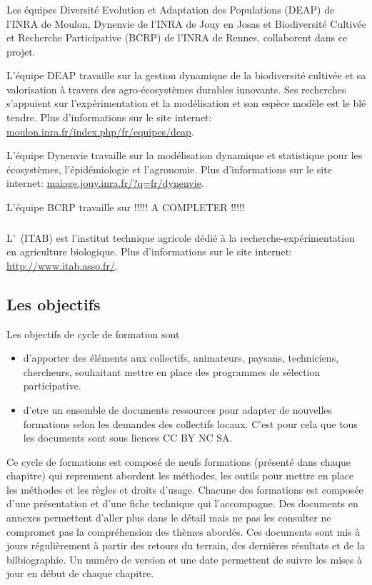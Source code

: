 \subsubsection{\INRA}
Les équipes 
Diversité Evolution et Adaptation des Populations (DEAP) de l'INRA de Moulon, 
Dynenvie de l'INRA de Jouy en Josas et 
Biodiversité Cultivée et Recherche Participative (BCRP) de l'INRA de Rennes, 
collaborent dans ce projet.

L'équipe DEAP travaille sur la gestion dynamique de la biodiversité cultivée et sa valorisation à travers des agro-écosystèmes durables innovants. 
Ses recherches s'appuient sur l'expérimentation et la modélisation et son espèce modèle est le blé tendre.
Plus d'informations sur le site internet: \url{moulon.inra.fr/index.php/fr/equipes/deap}.

L'équipe Dynenvie travaille sur la modélisation dynamique et statistique pour les écosystèmes, l'épidémiologie et l'agronomie.
Plus d'informations sur le site internet: \url{maiage.jouy.inra.fr/?q=fr/dynenvie}.

L'équipe BCRP travaille sur !!!!! A COMPLETER !!!!!

\subsubsection{\ITAB}
L'\ITAB~(ITAB) est l'institut technique agricole dédié à la recherche-expérimentation en agriculture biologique.
Plus d'informations sur le site internet: \url{http://www.itab.asso.fr/}.


\subsection{Les objectifs}
Les objectifs de cycle de formation sont

\begin{itemize}
\item d'apporter des éléments aux collectifs, animateurs, paysans, techniciens, chercheurs, souhaitant mettre en place des programmes de sélection participative.
\item d'etre un ensemble de documents ressources pour adapter de nouvelles formations selon les demandes des collectifs locaux. C'est pour cela que tous les documents sont sous liences CC BY NC SA.
\end{itemize}

Ce cycle de formations est composé de neufs formations (présenté dans chaque chapitre) qui reprennent abordent les méthodes, les outils pour mettre en place les méthodes et les règles et droits d’usage.
Chacune des formations est composée d’une présentation et d’une fiche technique qui l’accompagne. 
Des documents en annexes permettent d’aller plus dans le détail mais ne pas les consulter ne
compromet pas la compréhension des thèmes abordés. 
Ces documents sont mis à jours régulièrement à partir des retours du terrain, des dernières résultats et de la bilbiographie. 
Un numéro de version et une date permettent de suivre les mises à jour en début de chaque chapitre.

